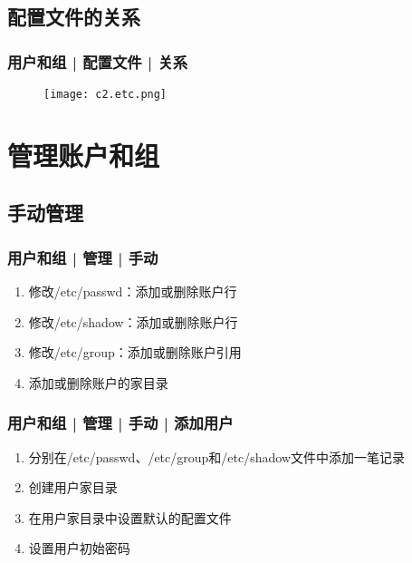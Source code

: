 \subsection{配置文件的关系}
\begin{frame}
  \frametitle{用户和组 | 配置文件 | \alert{关系}}
  \begin{figure}
    \centering
    \texttt{[image: c2.etc.png]}
  \end{figure}
\end{frame}

\section{管理账户和组}
\subsection{手动管理}
\begin{frame}
  \frametitle{用户和组 | 管理 | 手动}
  \begin{enumerate}
    \item 修改/etc/passwd：添加或删除账户行
    \item 修改/etc/shadow：添加或删除账户行
    \item 修改/etc/group：添加或删除账户引用
    \item 添加或删除账户的家目录
  \end{enumerate}
\end{frame}

\begin{frame}
  \frametitle{用户和组 | 管理 | 手动 | 添加用户}
  \begin{enumerate}
    \item 分别在/etc/passwd、/etc/group和/etc/shadow文件中添加一笔记录
    \item 创建用户家目录
    \item 在用户家目录中设置默认的配置文件
    \item 设置用户初始密码
  \end{enumerate}
\end{frame}

